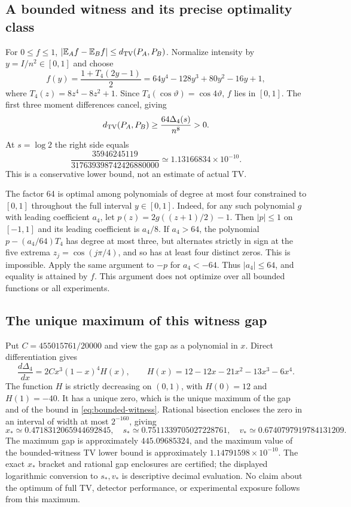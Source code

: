 \documentclass[11pt]{article}
\newcommand{\E}{\mathbb E}
\begin{document}
\subsection{A bounded witness and its precise optimality class}

For $0\le f\le1$, $|\E_Af-\E_Bf|\le d_{\rm TV}(P_A,P_B)$.
Normalize intensity by $y=I/n^2\in[0,1]$ and choose
\[
 f(y)=\frac{1+T_4(2y-1)}2
 =64y^4-128y^3+80y^2-16y+1,
\]
where $T_4(z)=8z^4-8z^2+1$. Since $T_4(\cos\vartheta)=\cos4\vartheta$,
$f$ lies in $[0,1]$. The first three moment differences cancel, giving
\begin{equation}\label{eq:bounded-witness}
 d_{\rm TV}(P_A,P_B)\ge\frac{64\Delta_4(s)}{n^8}>0.
\end{equation}
At $s=\log2$ the right side equals
\[
 \frac{35946245119}{317639398742426880000}
 \simeq1.13166834\times10^{-10}.
\]
This is a conservative lower bound, not an estimate of actual TV.

The factor 64 is optimal among polynomials of degree at most four constrained
to $[0,1]$ throughout the full interval $y\in[0,1]$. Indeed, for any such
polynomial $g$ with leading coefficient $a_4$, let
$p(z)=2g((z+1)/2)-1$. Then $|p|\le1$ on $[-1,1]$ and its leading
coefficient is $a_4/8$. If $a_4>64$, the polynomial
$p-(a_4/64)T_4$ has degree at most three, but alternates strictly in sign at
the five extrema $z_j=\cos(j\pi/4)$, and so has at least four distinct
zeros. This is impossible. Apply the same argument to $-p$ for $a_4<-64$.
Thus $|a_4|\le64$, and equality is attained by $f$.
This argument does not optimize over all bounded functions or all experiments.

\subsection{The unique maximum of this witness gap}

Put $C=455015761/20000$ and view the gap as a polynomial in $x$. Direct
differentiation gives
\[
 \frac{d\Delta_4}{dx}=2Cx^3(1-x)^4H(x),\qquad
 H(x)=12-12x-21x^2-13x^3-6x^4.
\]
The function $H$ is strictly decreasing on $(0,1)$, with $H(0)=12$ and
$H(1)=-40$. It has a unique zero, which is the unique maximum of the gap
and of the bound in \eqref{eq:bounded-witness}. Rational bisection encloses
the zero in an interval of width at most $2^{-160}$, giving
\[
 x_*\simeq0.4718312065944692845,\quad
 s_*\simeq0.7511339705027228761,\quad
 v_*\simeq0.6740797919784131209.
\]
The maximum gap is approximately $445.09685324$, and the maximum value of
the bounded-witness TV lower bound is approximately
$1.14791598\times10^{-10}$. The exact $x_*$ bracket and rational gap
enclosures are certified; the displayed logarithmic conversion to $s_*,v_*$
is descriptive decimal evaluation. No claim about the optimum of full TV,
detector performance, or experimental exposure follows from this maximum.
\end{document}
